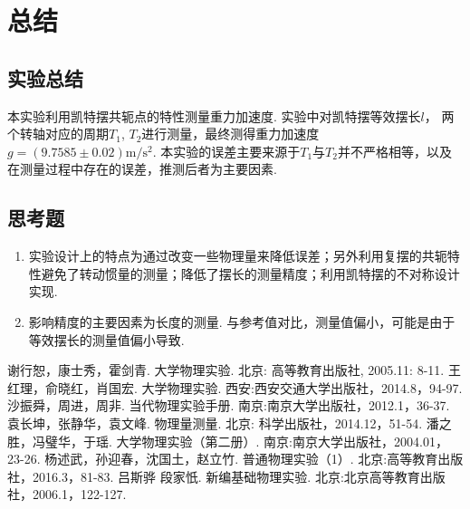 \documentclass[UTF8]{ctexart}
\begin{document}
\section{总结}
\subsection{实验总结}
本实验利用凯特摆共轭点的特性测量重力加速度. 实验中对凯特摆等效摆长$l$，
两个转轴对应的周期$T_1$, $T_2$进行测量，最终测得重力加速度$g=\left(9.7585 \pm 0.02\right)\mathrm{m/s^2}$.
本实验的误差主要来源于$T_1$与$T_2$并不严格相等，以及在测量过程中存在的误差，推测后者为主要因素.
\subsection{思考题}
\begin{enumerate}
  \item 实验设计上的特点为通过改变一些物理量来降低误差；另外利用复摆的共轭特性避免了转动惯量的测量；降低了摆长的测量精度；利用凯特摆的不对称设计实现.
  \item 影响精度的主要因素为长度的测量. 与参考值对比，测量值偏小，可能是由于等效摆长的测量值偏小导致.
\end{enumerate}

\begin{thebibliography}{100}
   谢行恕，康士秀，霍剑青. 大学物理实验. 北京: 高等教育出版社, 2005.11: 8-11.
   王红理，俞晓红，肖国宏. 大学物理实验. 西安:西安交通大学出版社，2014.8，94-97.
   沙振舜，周进，周非. 当代物理实验手册. 南京:南京大学出版社，2012.1，36-37.
   袁长坤，张静华，袁文峰. 物理量测量. 北京: 科学出版社，2014.12，51-54.
   潘之胜，冯璧华，于瑶. 大学物理实验（第二册）. 南京:南京大学出版社，2004.01， 23-26.
   杨述武，孙迎春，沈国土，赵立竹. 普通物理实验（1）. 北京:高等教育出版社，2016.3，81-83.
   吕斯骅 段家忯. 新编基础物理实验. 北京:北京高等教育出版社，2006.1，122-127.

\end{thebibliography}


\end{document}
